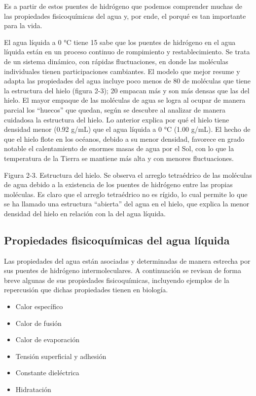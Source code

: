 Es a partir de estos puentes de hidrógeno que podemos comprender muchas de las propiedades fisicoquímicas del agua y, por ende, el porqué es tan importante para la vida. 

El agua líquida a 0 °C tiene 15%
sabe que los puentes de hidrógeno en el agua líquida están en un proceso continuo de
rompimiento y restablecimiento. Se trata de un sistema dinámico, con rápidas
fluctuaciones, en donde las moléculas individuales tienen participaciones cambiantes. El
modelo que mejor resume y adapta las propiedades del agua incluye poco menos de 80%
de moléculas que tiene la estructura del hielo (figura 2-3); 20%
empacan más y son más densas que las del hielo. El mayor empaque de las moléculas de
agua se logra al ocupar de manera parcial los “huecos” que quedan, según se descubre al
analizar de manera cuidadosa la estructura del hielo. Lo anterior explica por qué el hielo
tiene densidad menor (0.92 g/mL) que el agua líquida a 0 °C (1.00 g/mL). El hecho de
que el hielo flote en los océanos, debido a su menor densidad, favorece en grado notable
el calentamiento de enormes masas de agua por el Sol, con lo que la temperatura de la
Tierra se mantiene más alta y con menores fluctuaciones.


Figura 2-3. Estructura del hielo. Se observa el arreglo tetraédrico de las moléculas de agua debido a la existencia
de los puentes de hidrógeno entre las propias moléculas. Es claro que el arreglo tetraédrico no es rígido, lo cual
permite lo que se ha llamado una estructura “abierta” del agua en el hielo, que explica la menor densidad del hielo en relación con la del agua líquida.

\subsection{Propiedades fisicoquímicas del agua líquida}

Las propiedades del agua están asociadas y determinadas de manera estrecha por sus puentes de hidrógeno intermoleculares. A continuación se revisan de forma breve algunas de sus propiedades fisicoquímicas, incluyendo ejemplos de la repercusión que dichas propiedades tienen en biología.

\begin{itemize}
    \item Calor específico
    \item Calor de fusión
    \item Calor de evaporación
    \item Tensión superficial y adhesión 
    \item Constante dieléctrica
    \item Hidratación
\end{itemize}

